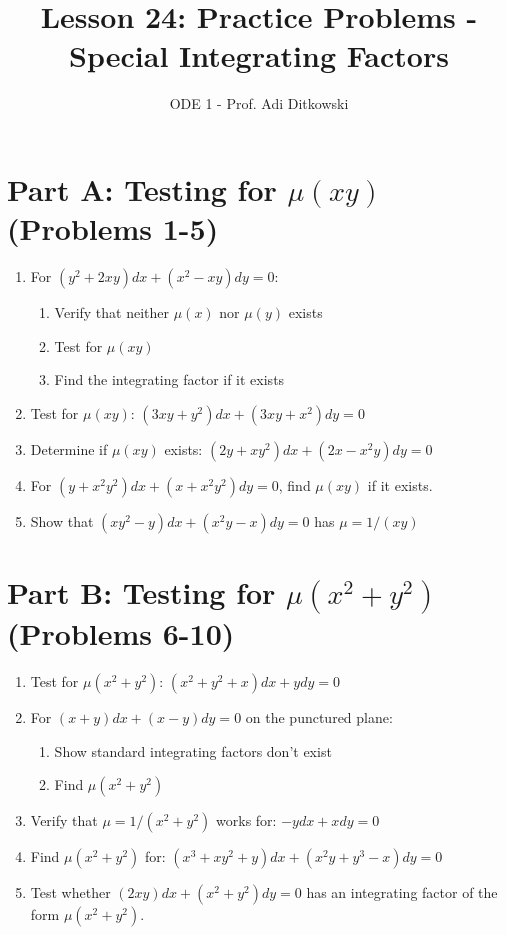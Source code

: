 \documentclass[12pt]{article}
\title{Lesson 24: Practice Problems - Special Integrating Factors}
\author{ODE 1 - Prof. Adi Ditkowski}
\date{}
\begin{document}
\maketitle

\section*{Part A: Testing for $\mu(xy)$ (Problems 1-5)}

\begin{enumerate}
\item For $(y^2 + 2xy)dx + (x^2 - xy)dy = 0$:
\begin{enumerate}[label=(\alph*)]
    \item Verify that neither $\mu(x)$ nor $\mu(y)$ exists
    \item Test for $\mu(xy)$
    \item Find the integrating factor if it exists
\end{enumerate}

\item Test for $\mu(xy)$: $(3xy + y^2)dx + (3xy + x^2)dy = 0$

\item Determine if $\mu(xy)$ exists: $(2y + xy^2)dx + (2x - x^2y)dy = 0$

\item For $(y + x^2y^2)dx + (x + x^2y^2)dy = 0$, find $\mu(xy)$ if it exists.

\item Show that $(xy^2 - y)dx + (x^2y - x)dy = 0$ has $\mu = 1/(xy)$
\end{enumerate}

\section*{Part B: Testing for $\mu(x^2 + y^2)$ (Problems 6-10)}

\begin{enumerate}[start=6]
\item Test for $\mu(x^2 + y^2)$: $(x^2 + y^2 + x)dx + ydy = 0$

\item For $(x + y)dx + (x - y)dy = 0$ on the punctured plane:
\begin{enumerate}[label=(\alph*)]
    \item Show standard integrating factors don't exist
    \item Find $\mu(x^2 + y^2)$
\end{enumerate}

\item Verify that $\mu = 1/(x^2 + y^2)$ works for:
$-y dx + x dy = 0$

\item Find $\mu(x^2 + y^2)$ for:
$(x^3 + xy^2 + y)dx + (x^2y + y^3 - x)dy = 0$

\item Test whether $(2xy)dx + (x^2 + y^2)dy = 0$ has an integrating factor of the form $\mu(x^2 + y^2)$.
\end{enumerate}
\end{document}

